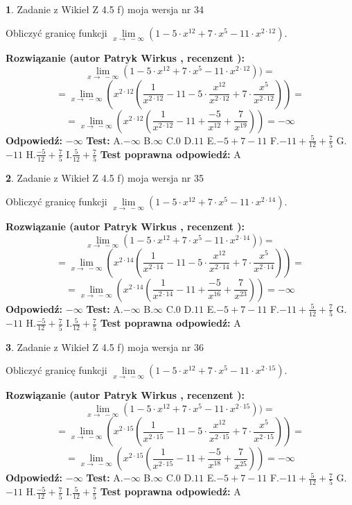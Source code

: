 \documentclass[12pt, a4paper]{article}
\theoremstyle{definition} %
\newtheorem{zad}{}
\newcommand{\zadStart}[1]{\begin{zad}#1\newline}
\newcommand{\zadStop}{\end{zad}}
\newcommand{\rozwStart}[2]{\noindent \textbf{Rozwiązanie (autor #1 , recenzent #2): }\newline}
\newcommand{\rozwStop}{\newline}
\newcommand{\odpStart}{\noindent \textbf{Odpowiedź:}\newline}
\newcommand{\odpStop}{\newline}
\newcommand{\testStart}{\noindent \textbf{Test:}\newline}
\newcommand{\testStop}{\newline}
\newcommand{\kluczStart}{\noindent \textbf{Test poprawna odpowiedź:}\newline}
\newcommand{\kluczStop}{\newline}
\begin{document}
\zadStart{Zadanie z Wikieł Z 4.5 f) moja wersja nr 34}



Obliczyć granicę funkcji  $\lim\limits_{x\to\ -\infty}(1 - 5 \cdot x^{12}+7 \cdot x^{5}- 11 \cdot x^{2\cdot12})$.
\zadStop
\rozwStart{Patryk Wirkus}{}
$$\lim\limits_{x\to\ -\infty}(1 - 5 \cdot x^{12}+7 \cdot x^{5}- 11 \cdot x^{2\cdot12}))=$$
$$=\lim\limits_{x\to\ -\infty}(x^{2\cdot12}(\frac{1}{x^{2\cdot12}}-11 -5 \cdot \frac{x^{12}}{x^{2\cdot12}}+7 \cdot \frac{x^{5}}{x^{2\cdot12}}))=$$
$$=\lim\limits_{x\to\ -\infty}(x^{2\cdot12}(\frac{1}{x^{2\cdot12}}-11 + \frac{-5}{x^{12}}+ \frac{7}{x^{19}}))=-\infty$$
\rozwStop
\odpStart
$-\infty$
\odpStop
\testStart
A.$-\infty$ B.$\infty$ C.$0$ D.$11$ E.$-5 + 7 - 11$
F.$-11+\frac{5}{12}+\frac{7}{5}$ G.$-11$
H.$\frac{-5}{12}+\frac{7}{5}$
I.$\frac{5}{12}+\frac{7}{5}$
\testStop
\kluczStart
A
\kluczStop



\zadStart{Zadanie z Wikieł Z 4.5 f) moja wersja nr 35}



Obliczyć granicę funkcji  $\lim\limits_{x\to\ -\infty}(1 - 5 \cdot x^{12}+7 \cdot x^{5}- 11 \cdot x^{2\cdot14})$.
\zadStop
\rozwStart{Patryk Wirkus}{}
$$\lim\limits_{x\to\ -\infty}(1 - 5 \cdot x^{12}+7 \cdot x^{5}- 11 \cdot x^{2\cdot14}))=$$
$$=\lim\limits_{x\to\ -\infty}(x^{2\cdot14}(\frac{1}{x^{2\cdot14}}-11 -5 \cdot \frac{x^{12}}{x^{2\cdot14}}+7 \cdot \frac{x^{5}}{x^{2\cdot14}}))=$$
$$=\lim\limits_{x\to\ -\infty}(x^{2\cdot14}(\frac{1}{x^{2\cdot14}}-11 + \frac{-5}{x^{16}}+ \frac{7}{x^{23}}))=-\infty$$
\rozwStop
\odpStart
$-\infty$
\odpStop
\testStart
A.$-\infty$ B.$\infty$ C.$0$ D.$11$ E.$-5 + 7 - 11$
F.$-11+\frac{5}{12}+\frac{7}{5}$ G.$-11$
H.$\frac{-5}{12}+\frac{7}{5}$
I.$\frac{5}{12}+\frac{7}{5}$
\testStop
\kluczStart
A
\kluczStop



\zadStart{Zadanie z Wikieł Z 4.5 f) moja wersja nr 36}



Obliczyć granicę funkcji  $\lim\limits_{x\to\ -\infty}(1 - 5 \cdot x^{12}+7 \cdot x^{5}- 11 \cdot x^{2\cdot15})$.
\zadStop
\rozwStart{Patryk Wirkus}{}
$$\lim\limits_{x\to\ -\infty}(1 - 5 \cdot x^{12}+7 \cdot x^{5}- 11 \cdot x^{2\cdot15}))=$$
$$=\lim\limits_{x\to\ -\infty}(x^{2\cdot15}(\frac{1}{x^{2\cdot15}}-11 -5 \cdot \frac{x^{12}}{x^{2\cdot15}}+7 \cdot \frac{x^{5}}{x^{2\cdot15}}))=$$
$$=\lim\limits_{x\to\ -\infty}(x^{2\cdot15}(\frac{1}{x^{2\cdot15}}-11 + \frac{-5}{x^{18}}+ \frac{7}{x^{25}}))=-\infty$$
\rozwStop
\odpStart
$-\infty$
\odpStop
\testStart
A.$-\infty$ B.$\infty$ C.$0$ D.$11$ E.$-5 + 7 - 11$
F.$-11+\frac{5}{12}+\frac{7}{5}$ G.$-11$
H.$\frac{-5}{12}+\frac{7}{5}$
I.$\frac{5}{12}+\frac{7}{5}$
\testStop
\kluczStart
A
\kluczStop
\end{document}
